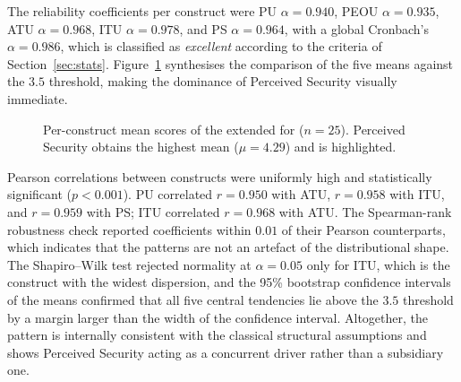 \documentclass[a4paper,fleqn]{cas-sc}
\begin{document}
	The reliability coefficients per construct were PU $\alpha=0.940$, PEOU $\alpha=0.935$, ATU $\alpha=0.968$, ITU $\alpha=0.978$, and PS $\alpha=0.964$, with a global Cronbach's $\alpha=0.986$, which is classified as \emph{excellent} according to the criteria of Section~\ref{sec:stats}. Figure~\ref{fig:tam} synthesises the comparison of the five means against the $3.5$ threshold, making the dominance of Perceived Security visually immediate.
	
	\begin{figure}[t]
		\centering
		\caption{Per-construct mean scores of the extended \TAM{} for \RUTAI{} ($n=25$). Perceived Security obtains the highest mean ($\mu=4.29$) and is highlighted.}
		\label{fig:tam}
	\end{figure}
	
	Pearson correlations between constructs were uniformly high and statistically significant ($p<0.001$). PU correlated $r=0.950$ with ATU, $r=0.958$ with ITU, and $r=0.959$ with PS; ITU correlated $r=0.968$ with ATU. The Spearman-rank robustness check reported coefficients within $0.01$ of their Pearson counterparts, which indicates that the patterns are not an artefact of the distributional shape. The Shapiro--Wilk test rejected normality at $\alpha=0.05$ only for ITU, which is the construct with the widest dispersion, and the 95\% bootstrap confidence intervals of the means confirmed that all five central tendencies lie above the $3.5$ threshold by a margin larger than the width of the confidence interval. Altogether, the pattern is internally consistent with the classical \TAM{} structural assumptions \citep{davis1989tam} and shows Perceived Security acting as a concurrent driver rather than a subsidiary one.
	
\end{document}
